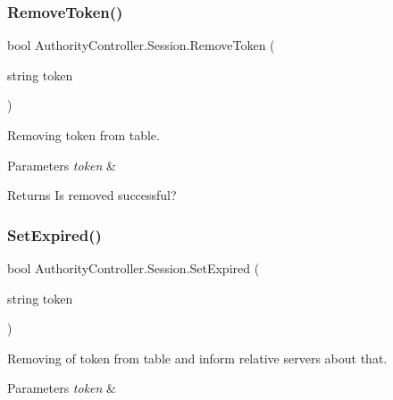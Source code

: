 \subsubsection{\texorpdfstring{Remove\+Token()}{RemoveToken()}}
{\footnotesize\ttfamily bool Authority\+Controller.\+Session.\+Remove\+Token (\begin{DoxyParamCaption}\item[{string}]{token }\end{DoxyParamCaption})\hspace{0.3cm}{\ttfamily [private]}}



Removing token from table. 


\begin{DoxyParams}{Parameters}
{\em token} & \\
\hline
\end{DoxyParams}
\begin{DoxyReturn}{Returns}
Is removed successful?
\end{DoxyReturn}
\mbox{\label{class_authority_controller_1_1_session_a811b23b70e61ac567ec8eeb54641ffcd}} 
\subsubsection{\texorpdfstring{Set\+Expired()}{SetExpired()}}
{\footnotesize\ttfamily bool Authority\+Controller.\+Session.\+Set\+Expired (\begin{DoxyParamCaption}\item[{string}]{token }\end{DoxyParamCaption})}



Removing of token from table and inform relative servers about that. 


\begin{DoxyParams}{Parameters}
{\em token} & \\
\hline
\end{DoxyParams}
\mbox{\label{class_authority_controller_1_1_session_a135fc2981f8ad7d26d484c9c9bcbf83c}} 
